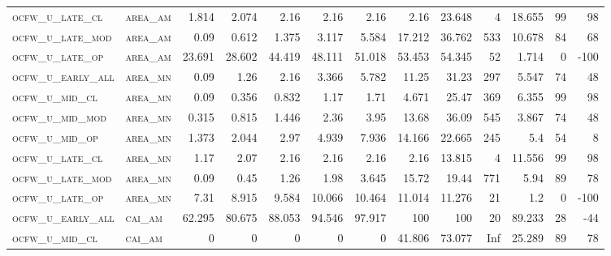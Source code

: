 \begin{landscape}
\begin{center}
\begin{footnotesize}
\begin{longtable}{llrrrrrrrr|rrr}
\textsc{ocfw\_u\_late\_cl  } & \textsc{area\_am  }   & 1.814    & 2.074    & 2.16     & 2.16     & 2.16     & 2.16     & 23.648    & 4      & 18.655        & 99            & 98              \\
\textsc{ocfw\_u\_late\_mod } & \textsc{area\_am  }   & 0.09     & 0.612    & 1.375    & 3.117    & 5.584    & 17.212   & 36.762    & 533    & 10.678        & 84            & 68              \\
\textsc{ocfw\_u\_late\_op  } & \textsc{area\_am  }   & 23.691   & 28.602   & 44.419   & 48.111   & 51.018   & 53.453   & 54.345    & 52     & 1.714         & 0             & -100            \\
\textsc{ocfw\_u\_early\_all} & \textsc{area\_mn  }   & 0.09     & 1.26     & 2.16     & 3.366    & 5.782    & 11.25    & 31.23     & 297    & 5.547         & 74            & 48              \\
\textsc{ocfw\_u\_mid\_cl   } & \textsc{area\_mn  }   & 0.09     & 0.356    & 0.832    & 1.17     & 1.71     & 4.671    & 25.47     & 369    & 6.355         & 99            & 98              \\
\textsc{ocfw\_u\_mid\_mod  } & \textsc{area\_mn  }   & 0.315    & 0.815    & 1.446    & 2.36     & 3.95     & 13.68    & 36.09     & 545    & 3.867         & 74            & 48              \\
\textsc{ocfw\_u\_mid\_op   } & \textsc{area\_mn  }   & 1.373    & 2.044    & 2.97     & 4.939    & 7.936    & 14.166   & 22.665    & 245    & 5.4           & 54            & 8               \\
\textsc{ocfw\_u\_late\_cl  } & \textsc{area\_mn  }   & 1.17     & 2.07     & 2.16     & 2.16     & 2.16     & 2.16     & 13.815    & 4      & 11.556        & 99            & 98              \\
\textsc{ocfw\_u\_late\_mod } & \textsc{area\_mn  }   & 0.09     & 0.45     & 1.26     & 1.98     & 3.645    & 15.72    & 19.44     & 771    & 5.94          & 89            & 78              \\
\textsc{ocfw\_u\_late\_op  } & \textsc{area\_mn  }   & 7.31     & 8.915    & 9.584    & 10.066   & 10.464   & 11.014   & 11.276    & 21     & 1.2           & 0             & -100            \\
\textsc{ocfw\_u\_early\_all} & \textsc{cai\_am   }   & 62.295   & 80.675   & 88.053   & 94.546   & 97.917   & 100      & 100       & 20     & 89.233        & 28            & -44             \\
\textsc{ocfw\_u\_mid\_cl   } & \textsc{cai\_am   }   & 0        & 0        & 0        & 0        & 0        & 41.806   & 73.077    & Inf    & 25.289        & 89            & 78              \\

\end{longtable}
\end{footnotesize}
\end{center}
\end{landscape}
